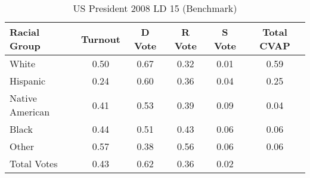 \begin{table}[htb]
\begin{center}
\caption{US President 2008 LD 15 (Benchmark)}
\label{pres08_cvap_ld_15_benchmark}
\begin{tabular}{lccccc}
  \hline
Racial Group & Turnout & D Vote & R Vote & S Vote & Total CVAP \\ 
  \hline
White & 0.50 & 0.67 & 0.32 & 0.01 & 0.59 \\ 
  Hispanic & 0.24 & 0.60 & 0.36 & 0.04 & 0.25 \\ 
  Native American & 0.41 & 0.53 & 0.39 & 0.09 & 0.04 \\ 
  Black & 0.44 & 0.51 & 0.43 & 0.06 & 0.06 \\ 
  Other & 0.57 & 0.38 & 0.56 & 0.06 & 0.06 \\ 
  Total Votes & 0.43 & 0.62 & 0.36 & 0.02 &  \\ 
   \hline
\end{tabular}
\end{center}
\end{table}
